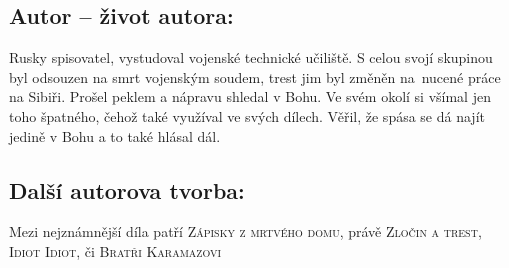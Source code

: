 \documentclass[A4paper]{extarticle} %
\begin{document}


\subsection*{Autor {\ssmall -- život autora:}}
\noindent 
Rusky spisovatel, vystudoval vojenské technické učiliště. S celou svojí skupinou byl odsouzen na smrt vojenským soudem, trest jim byl změněn na~nucené práce na Sibiři. Prošel peklem a nápravu shledal v Bohu. Ve svém okolí si všímal jen toho špatného, čehož také využíval ve svých dílech. Věřil, že spása se dá najít jedině v Bohu a to také hlásal dál.


\subsection*{Další autorova tvorba:}
\noindent 
Mezi nejznámnější díla patří \textsc{Zápisky z mrtvého domu}, právě \textsc{Zločin a trest}, \textsc{Idiot Idiot}, či \textsc{Bratři Karamazovi}




\end{document}
